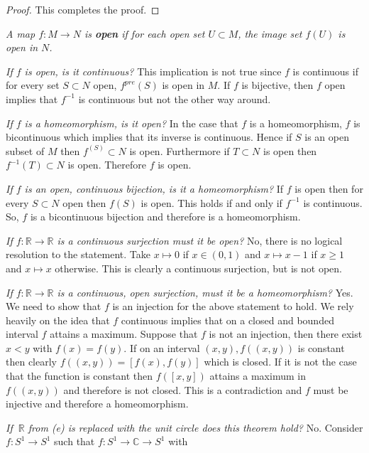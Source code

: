 \documentclass[letter]{article}
\newenvironment{menumerate}{%
  \edef\backupindent{\the\parindent}%
  \enumerate%
  \setlength{\parindent}{\backupindent}%
}{\endenumerate}
\begin{document}
\begin{menumerate}
\begin{proof}
			 This completes the proof.
			 \end{proof}
		 \setcounter{enumi}{27}
		 \item \emph{A map $f: M \to N$ is \textbf{open} if for each open set $U\subset M$, the image set $f(U)$ is open in $N$. }
		 	\begin{menumerate}
		 		\item \emph{If $f$ is open, is it continuous?} This implication is not true since $f$ is continuous if for every set $S \subset N$ open, $f^{pre}(S)$ is open in $M$. If $f$ is bijective, then $f$ open implies that $f^{-1}$ is continuous but not the other way around.
		 		\item \emph{If $f$ is a homeomorphism, is it open?} In the case that $f$ is a homeomorphism, $f$ is bicontinuous which implies that its inverse is continuous. Hence if $S$ is an open subset of $M$ then $f^(S)\subset N$ is open. Furthermore if $T \subset N$ is open then $f^{-1}(T) \subset N$ is open. Therefore $f$ is open.
		 		\item \emph{If $f$ is an open, continuous bijection, is it a homeomorphism?}  If $f$ is open then for every $S\subset N$ open then $f(S)$ is open. This holds if and only if $f^{-1}$ is continuous. So, $f$ is a bicontinuous bijection and therefore is a homeomorphism.
		 		\item \emph{If $f: \mathbb{R} \to \mathbb{R}$ is a continuous surjection must it be open?} No, there is no logical resolution to the statement. Take $x\mapsto 0$ if $x \in (0,1)$ and $x\mapsto x -1$ if $x \geq 1$ and $x \mapsto x$ otherwise. This is clearly a continuous surjection, but is not open. 
		 		\item \emph{If $f:\mathbb{R} \to \mathbb{R}$ is a continuous, open surjection, must it be a homeomorphism?} Yes. We need to show that $f$ is an injection for the above statement to hold. We rely heavily on the idea that $f$ continuous implies that on a closed and bounded interval $f$ attains a maximum. Suppose that $f$ is not an injection, then there exist $x <y$ with $f(x) = f(y).$ If on an interval $(x,y), f((x,y))$ is constant then clearly $f((x,y)) = [f(x),f(y)]$ which is closed. If it is not the case that the function is constant then $f([x,y])$ attains a maximum in $f((x,y))$ and therefore is not closed. This is a contradiction and $f$ must be injective and therefore a homeomorphism.
		 		\item \emph{If $\ \mathbb{R}$ from (e) is replaced with the unit circle does this theorem hold?} No. Consider $f: S^1 \to S^1$ such that $f:S^1 \to \mathbb{C} \to S^1$ with

\end{menumerate}
\end{menumerate}
\end{document}
